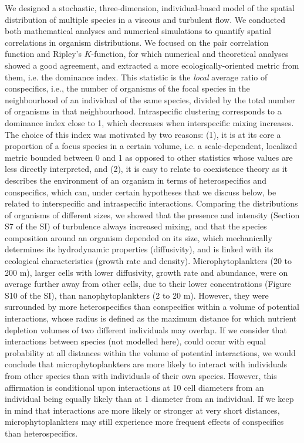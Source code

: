 \documentclass[english]{article}
\begin{document}
We designed a stochastic, three-dimension, individual-based model
of the spatial distribution of multiple species in a viscous and turbulent
flow. We conducted both mathematical analyses and numerical simulations
to quantify spatial correlations in organism distributions. We focused
on the pair correlation function and Ripley's $K$-function, for which
numerical and theoretical analyses showed a good agreement, and extracted
a more ecologically-oriented metric from them, i.e. the dominance
index. This statistic is the \textit{local} average ratio of conspecifics,
i.e., the number of organisms of the focal species in the neighbourhood
of an individual of the same species, divided by the total number
of organisms in that neighbourhood. Intraspecific clustering corresponds
to a dominance index close to 1, which decreases when interspecific
mixing increases. The choice of this index was motivated by two reasons:
(1), it is at its core a proportion of a focus species in a certain
volume, i.e. a scale-dependent, localized metric bounded between 0
and 1 as opposed to other statistics whose values are less directly
interpreted, and (2), it is easy to relate to coexistence theory as
it describes the environment of an organism in terms of heterospecifics
and conspecifics, which can, under certain hypotheses that we discuss
below, be related to interspecific and intraspecific interactions.
Comparing the distributions of organisms of different sizes, we showed
that the presence and intensity (Section S7 of the SI) of turbulence
always increased mixing, and that the species composition around an
organism depended on its size, which mechanically determines its hydrodynamic
properties (diffusivity), and is linked with its ecological characteristics
(growth rate and density). Microphytoplankters (20 to 200 \textmu
m), larger cells with lower diffusivity, growth rate and abundance,
were on average further away from other cells, due to their lower
concentrations (Figure S10 of the SI), than nanophytoplankters (2
to 20 \textmu m). However, they were surrounded by more heterospecifics
than conspecifics within a volume of potential interactions, whose
radius is defined as the maximum distance for which nutrient depletion
volumes of two different individuals may overlap. If we consider that
interactions between species (not modelled here), could occur with
equal probability at all distances within the volume of potential
interactions, we would conclude that microphytoplankters are more
likely to interact with individuals from other species than with individuals
of their own species. However, this affirmation is conditional upon
interactions at 10 cell diameters from an individual being equally
likely than at 1 diameter from an individual. If we keep in mind that
interactions are more likely or stronger at very short distances,
microphytoplankters may still experience more frequent effects of
conspecifics than heterospecifics.
\end{document}
